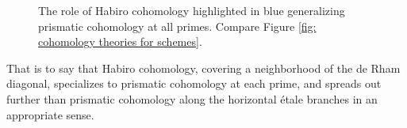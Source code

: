 \begin{figure}[H]
\begin{center}


    \end{center}
    \caption{The role of Habiro cohomology highlighted in blue generalizing prismatic cohomology at all primes. Compare Figure \ref{fig: cohomology theories for schemes}.}
\end{figure}
That is to say that Habiro cohomology, covering a neighborhood of the de Rham diagonal, specializes to prismatic cohomology at each prime, and spreads out further than prismatic cohomology along the horizontal \'{e}tale branches in an appropriate sense. 

